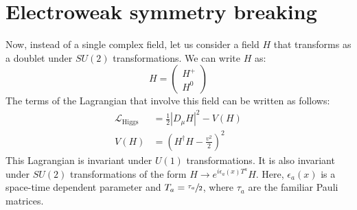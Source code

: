 \section{Electroweak symmetry breaking}

Now, instead of a single complex field, let us consider a field $H$ that transforms as a doublet under $SU(2)$ transformations. We can write $H$ as:
$$H = \begin{pmatrix}H^{+}\\H^0\end{pmatrix}$$
The terms of the Lagrangian that involve this field can be written as follows:
\begin{align*}
  \mathcal{L}_{\text{Higgs}} &= \frac{1}{2}\left|D_\mu H\right|^2-V(H)\\
  V(H) &= \left(H^\dag H-\frac{v^2}{2}\right)^2
\end{align*}
This Lagrangian is invariant under $U(1)$ transformations. It is also invariant under $SU(2)$ transformations of the form $H\rightarrow e^{i\epsilon_a(x)T^a}H$. Here, $\epsilon_a (x)$ is a space-time dependent parameter and $T_a = \sfrac{\tau_a}{2}$, where $\tau_a$ are the familiar Pauli matrices.

